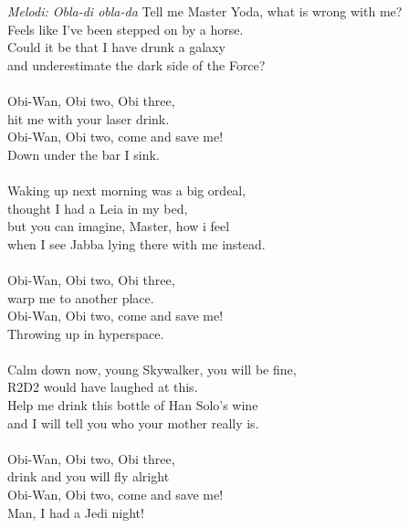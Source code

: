 {\footnotesize\textit{Melodi: Obla-di obla-da}}
Tell me Master Yoda, what is wrong with me?\\
Feels like I've been stepped on by a horse.\\
Could it be that I have drunk a galaxy\\
and underestimate the dark side of the Force?\\
\\
Obi-Wan, Obi two, Obi three,\\
hit me with your laser drink.\\
Obi-Wan, Obi two, come and save me! \\
Down under the bar I sink.\\
\\
Waking up next morning was a big ordeal,\\
thought I had a Leia in my bed,\\
but you can imagine, Master, how i feel\\
when I see Jabba lying there with me instead.\\
\\
Obi-Wan, Obi two, Obi three,\\
warp me to another place.\\
Obi-Wan, Obi two, come and save me!\\
Throwing up in hyperspace.\\
\\
Calm down now, young Skywalker, you will be fine,\\
R2D2 would have laughed at this.\\
Help me drink this bottle of Han Solo’s wine\\
and I will tell you who your mother really is.\\
\\
Obi-Wan, Obi two, Obi three,\\
drink and you will fly alright\\
Obi-Wan, Obi two, come and save me!\\
Man, I had a Jedi night!
\par
\vspace{10pt}


